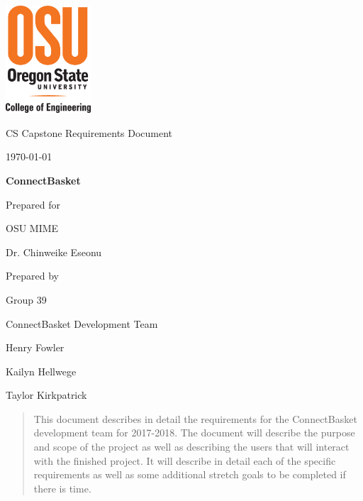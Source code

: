 \documentclass[onecolumn, draftclsnofoot,10pt, compsoc]{IEEEtran}
\def \CapstoneTeamName{		ConnectBasket Development Team}
\def \CapstoneTeamNumber{		39}
\def \GroupMemberOne{			Henry Fowler}
\def \GroupMemberTwo{			Kailyn Hellwege}
\def \GroupMemberThree{			Taylor Kirkpatrick}
\def \CapstoneProjectName{		ConnectBasket}
\def \CapstoneSponsorCompany{	OSU MIME}
\def \CapstoneSponsorPerson{		Dr. Chinweike Eseonu}
\def \DocType{		%
				Requirements Document
				}
\newcommand{\NameSigPair}[1]{\par
\makebox[2.75in][r]{#1} \hfil 	\makebox[3.25in]{\makebox[2.25in]{\hrulefill} \hfill		\makebox[.75in]{\hrulefill}}
\par\vspace{-12pt} \textit{\tiny\noindent
\makebox[2.75in]{} \hfil		\makebox[3.25in]{\makebox[2.25in][r]{Signature} \hfill	\makebox[.75in][r]{Date}}}}
\renewcommand{\NameSigPair}[1]{#1}
\begin{document}
\begin{titlepage}
    \begin{singlespace}
    	\includegraphics[height=4cm]{coe_v_spot1}
        \hfill 
        \par\vspace{.2in}
        \centering
        \scshape{
            \huge CS Capstone \DocType \par
            {\large\today}\par
            \vspace{.5in}
            \textbf{\Huge\CapstoneProjectName}\par
            \vfill
            {\large Prepared for}\par
            \Huge \CapstoneSponsorCompany\par
            \vspace{5pt}
            {\Large\NameSigPair{\CapstoneSponsorPerson}\par}
            {\large Prepared by }\par
            Group\CapstoneTeamNumber\par
            \CapstoneTeamName\par 
            \vspace{5pt}
            {\Large
                \NameSigPair{\GroupMemberOne}\par
                \NameSigPair{\GroupMemberTwo}\par
                \NameSigPair{\GroupMemberThree}\par
            }
            \vspace{20pt}
        }
        \begin{abstract}
        This document describes in detail the requirements for the ConnectBasket development team for 2017-2018. The document will describe the purpose and scope of the project as well as describing the users that will interact with the finished project. It will describe in detail each of the specific requirements as well as some additional stretch goals to be completed if there is time.
        \end{abstract}     
    \end{singlespace}
\end{titlepage}
\newpage
{}
\tableofcontents
\clearpage
\end{document}
